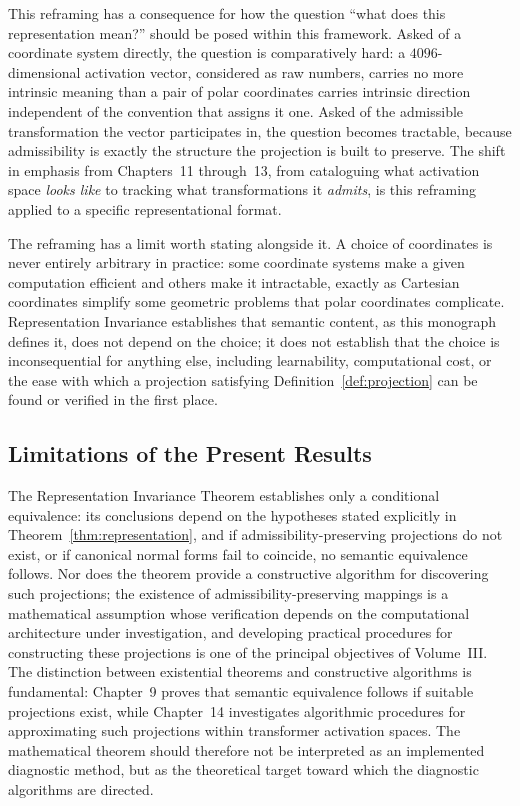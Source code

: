 \documentclass[11pt,twoside,openright]{book}
\numberwithin{equation}{chapter}
\theoremstyle{definition}
\theoremstyle{plain}
\theoremstyle{remark}
\theoremstyle{definition}
\begin{document}
This reframing has a consequence for how the question ``what does this
representation mean?'' should be posed within this framework. Asked of a
coordinate system directly, the question is comparatively hard: a
$4096$-dimensional activation vector, considered as raw numbers, carries
no more intrinsic meaning than a pair of polar coordinates carries
intrinsic direction independent of the convention that assigns it one.
Asked of the admissible transformation the vector participates in, the
question becomes tractable, because admissibility is exactly the
structure the projection is built to preserve. The shift in emphasis
from Chapters~11 through~13, from cataloguing what activation space
\emph{looks like} to tracking what transformations it \emph{admits}, is
this reframing applied to a specific representational format.

The reframing has a limit worth stating alongside it. A choice of
coordinates is never entirely arbitrary in practice: some coordinate
systems make a given computation efficient and others make it
intractable, exactly as Cartesian coordinates simplify some geometric
problems that polar coordinates complicate. Representation Invariance
establishes that semantic content, as this monograph defines it, does not
depend on the choice; it does not establish that the choice is
inconsequential for anything else, including learnability, computational
cost, or the ease with which a projection satisfying
Definition~\ref{def:projection} can be found or verified in the first
place.

\subsection{Limitations of the Present Results}

The Representation Invariance Theorem establishes only a conditional
equivalence: its conclusions depend on the hypotheses stated explicitly
in Theorem~\ref{thm:representation}, and if admissibility-preserving
projections do not exist, or if canonical normal forms fail to coincide,
no semantic equivalence follows. Nor does the theorem provide a
constructive algorithm for discovering such projections; the existence of
admissibility-preserving mappings is a mathematical assumption whose
verification depends on the computational architecture under
investigation, and developing practical procedures for constructing these
projections is one of the principal objectives of Volume~III. The
distinction between existential theorems and constructive algorithms is
fundamental: Chapter~9 proves that semantic equivalence follows if
suitable projections exist, while Chapter~14 investigates algorithmic
procedures for approximating such projections within transformer
activation spaces. The mathematical theorem should therefore not be
interpreted as an implemented diagnostic method, but as the theoretical
target toward which the diagnostic algorithms are directed.
\end{document}
